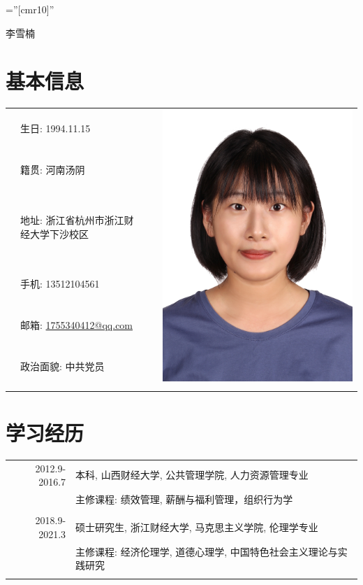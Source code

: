 \documentclass[a4paper,11pt]{article}
\begin{document}

\pagestyle{empty} %

\font\fb=''[cmr10]'' %

\par{
		\begin{center}{\Huge 李雪楠
	}\end{center}

\par}

\section{基本信息}

\begin{tabular}{rlrr}
  &生日: 1994.11.15 & \quad\quad\quad\quad\quad\quad\quad\quad & \multirow{6}{*}{\includegraphics[width=0.18  \textwidth]{baby.jpg}}\\
  &籍贯: 河南汤阴 \\
  &地址: 浙江省杭州市浙江财经大学下沙校区\\
  &手机: 13512104561\\
  &邮箱: \href{mailto:1755340412@qq.com}{1755340412@qq.com}\\
  &政治面貌: 中共党员\\
  \\
\end{tabular}



\section{学习经历}
\begin{tabular}{rl}
\textsc{2012.9-2016.7} & 本科, 山西财经大学, 公共管理学院, 人力资源管理专业\\
& 主修课程: 绩效管理, 薪酬与福利管理，组织行为学\\&\\
\textsc{2018.9-2021.3} & 硕士研究生, 浙江财经大学, 马克思主义学院, 伦理学专业\\
& 主修课程: 经济伦理学, 道德心理学, 中国特色社会主义理论与实践研究\\&\\
\end{tabular}
\end{document}
